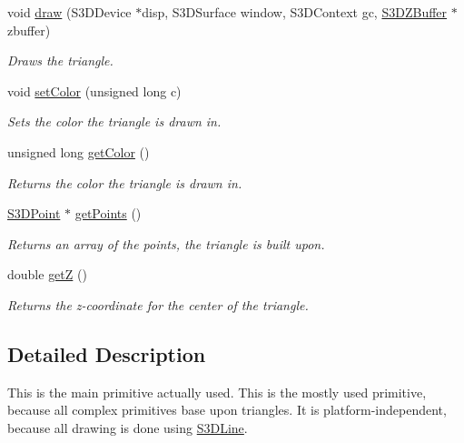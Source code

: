 \begin{DoxyCompactItemize}
void \hyperlink{class_s3_d_triangle_acf6924908c89d6bbc5af23769243beaf}{draw} (S3DDevice $\ast$disp, S3DSurface window, S3DContext gc, \hyperlink{class_s3_d_z_buffer}{S3DZBuffer} $\ast$zbuffer)
\begin{DoxyCompactList}\small\item\em Draws the triangle. \item\end{DoxyCompactList}\item 
void \hyperlink{class_s3_d_triangle_a2c60503c3bae194ec8247a0e2467c915}{setColor} (unsigned long c)
\begin{DoxyCompactList}\small\item\em Sets the color the triangle is drawn in. \item\end{DoxyCompactList}\item 
unsigned long \hyperlink{class_s3_d_triangle_ade8ba96094206ee3dff5c3bc743e0a1c}{getColor} ()
\begin{DoxyCompactList}\small\item\em Returns the color the triangle is drawn in. \item\end{DoxyCompactList}\item 
\hyperlink{class_s3_d_point}{S3DPoint} $\ast$ \hyperlink{class_s3_d_triangle_a1032adb6846335a47c8e8c0355b69dbd}{getPoints} ()
\begin{DoxyCompactList}\small\item\em Returns an array of the points, the triangle is built upon. \item\end{DoxyCompactList}\item 
double \hyperlink{class_s3_d_triangle_a35428b5799c8d51a6c57d1fdb5b575a1}{getZ} ()
\begin{DoxyCompactList}\small\item\em Returns the z-\/coordinate for the center of the triangle. \item\end{DoxyCompactList}\end{DoxyCompactItemize}


\subsection{Detailed Description}
This is the main primitive actually used. This is the mostly used primitive, because all complex primitives base upon triangles. It is platform-\/independent, because all drawing is done using \hyperlink{class_s3_d_line}{S3DLine}. 

